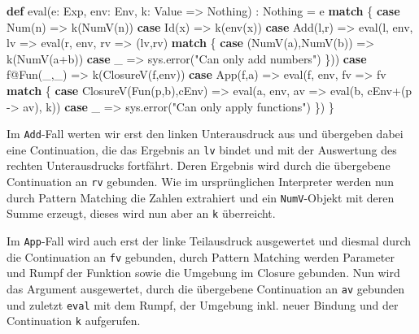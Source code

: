 \documentclass[]{article}
\newenvironment{Shaded}{}{}
\newcommand{\FunctionTok}[1]{\textcolor[rgb]{0.02,0.16,0.49}{#1}}
\newcommand{\KeywordTok}[1]{\textcolor[rgb]{0.00,0.44,0.13}{\textbf{#1}}}
\newcommand{\NormalTok}[1]{#1}
\newcommand{\StringTok}[1]{\textcolor[rgb]{0.25,0.44,0.63}{#1}}
\begin{document}
\begin{Shaded}
\begin{Highlighting}[]
\KeywordTok{def} \FunctionTok{eval}\NormalTok{(e: Exp, env: Env, k: Value =\textgreater{} Nothing) : Nothing = e }\KeywordTok{match}\NormalTok{ \{}
  \KeywordTok{case} \FunctionTok{Num}\NormalTok{(n) =\textgreater{} }\FunctionTok{k}\NormalTok{(}\FunctionTok{NumV}\NormalTok{(n))}
  \KeywordTok{case} \FunctionTok{Id}\NormalTok{(x) =\textgreater{} }\FunctionTok{k}\NormalTok{(}\FunctionTok{env}\NormalTok{(x))}
  \KeywordTok{case} \FunctionTok{Add}\NormalTok{(l,r) =\textgreater{} }\FunctionTok{eval}\NormalTok{(l, env, lv =\textgreater{} }\FunctionTok{eval}\NormalTok{(r, env, rv =\textgreater{} (lv,rv) }\KeywordTok{match}\NormalTok{ \{}
    \KeywordTok{case}\NormalTok{ (}\FunctionTok{NumV}\NormalTok{(a),}\FunctionTok{NumV}\NormalTok{(b)) =\textgreater{} }\FunctionTok{k}\NormalTok{(}\FunctionTok{NumV}\NormalTok{(a+b))}
    \KeywordTok{case}\NormalTok{ \_ =\textgreater{} sys.}\FunctionTok{error}\NormalTok{(}\StringTok{"Can only add numbers"}\NormalTok{)}
\NormalTok{  \}))}
  \KeywordTok{case}\NormalTok{ f@}\FunctionTok{Fun}\NormalTok{(\_,\_) =\textgreater{} }\FunctionTok{k}\NormalTok{(}\FunctionTok{ClosureV}\NormalTok{(f,env))}
  \KeywordTok{case} \FunctionTok{App}\NormalTok{(f,a) =\textgreater{} }\FunctionTok{eval}\NormalTok{(f, env, fv =\textgreater{} fv }\KeywordTok{match}\NormalTok{ \{}
    \KeywordTok{case} \FunctionTok{ClosureV}\NormalTok{(}\FunctionTok{Fun}\NormalTok{(p,b),cEnv) =\textgreater{}}
      \FunctionTok{eval}\NormalTok{(a, env, av =\textgreater{} }\FunctionTok{eval}\NormalTok{(b, cEnv+(p {-}\textgreater{} av), k))}
    \KeywordTok{case}\NormalTok{ \_ =\textgreater{} sys.}\FunctionTok{error}\NormalTok{(}\StringTok{"Can only apply functions"}\NormalTok{)}
\NormalTok{  \})}
\NormalTok{\}}
\end{Highlighting}
\end{Shaded}

Im \texttt{Add}-Fall werten wir erst den linken Unterausdruck aus und
übergeben dabei eine Continuation, die das Ergebnis an \texttt{lv}
bindet und mit der Auswertung des rechten Unterausdrucks fortfährt.
Deren Ergebnis wird durch die übergebene Continuation an \texttt{rv}
gebunden. Wie im ursprünglichen Interpreter werden nun durch Pattern
Matching die Zahlen extrahiert und ein \texttt{NumV}-Objekt mit deren
Summe erzeugt, dieses wird nun aber an \texttt{k} überreicht.

Im \texttt{App}-Fall wird auch erst der linke Teilausdruck ausgewertet
und diesmal durch die Continuation an \texttt{fv} gebunden, durch
Pattern Matching werden Parameter und Rumpf der Funktion sowie die
Umgebung im Closure gebunden. Nun wird das Argument ausgewertet, durch
die übergebene Continuation an \texttt{av} gebunden und zuletzt
\texttt{eval} mit dem Rumpf, der Umgebung inkl. neuer Bindung und der
Continuation \texttt{k} aufgerufen.
\end{document}
